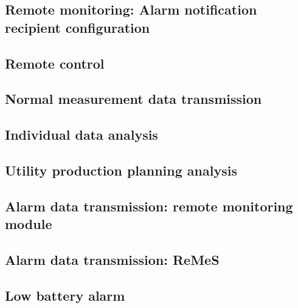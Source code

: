 \subsection{Remote monitoring: Alarm notification recipient configuration}
\label{uc-remote-monitoring-notification-config}


\subsection{Remote control}
\label{uc-remote-control}


\subsection{Normal measurement data transmission}
\label{uc-normal-measurement}


\subsection{Individual data analysis}
\label{uc-individual-analysis}


\subsection{Utility production planning analysis}
\label{uc-production-planning}


\subsection{Alarm data transmission: remote monitoring module}
\label{uc-alarm-transmission-module}


\subsection{Alarm data transmission: ReMeS}
\label{uc-alarm-transmission-remes}


\subsection{Low battery alarm}
\label{uc-low-battery-alarm}


